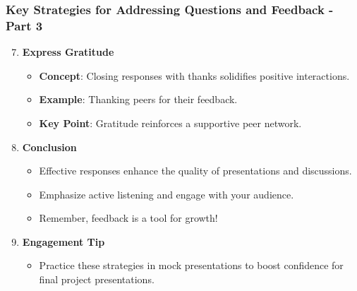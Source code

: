 \documentclass[aspectratio=169]{beamer}
\begin{document}
\begin{frame}[fragile]
    \frametitle{Key Strategies for Addressing Questions and Feedback - Part 3}
    \begin{enumerate}
        \setcounter{enumi}{6} %
        \item \textbf{Express Gratitude}
        \begin{itemize}
            \item \textbf{Concept}: Closing responses with thanks solidifies positive interactions.
            \item \textbf{Example}: Thanking peers for their feedback.
            \item \textbf{Key Point}: Gratitude reinforces a supportive peer network.
        \end{itemize}

        \item \textbf{Conclusion}
        \begin{itemize}
            \item Effective responses enhance the quality of presentations and discussions.
            \item Emphasize active listening and engage with your audience.
            \item Remember, feedback is a tool for growth!
        \end{itemize}

        \item \textbf{Engagement Tip}
        \begin{itemize}
            \item Practice these strategies in mock presentations to boost confidence for final project presentations.
        \end{itemize}
    \end{enumerate}
\end{frame}
\end{document}
